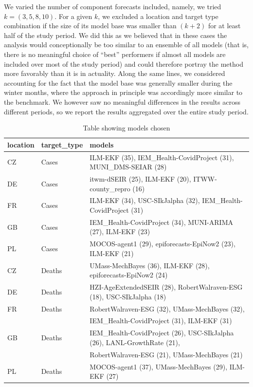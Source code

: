 We varied the number of component forecasts included, namely, we tried $k = (3,5,8,10)$. For a given $k$, we excluded a location and target type combination if the size of its model base was smaller than $(k+2)$ for at least half of the study period. We did this as we believed that in these cases the analysis would conceptionally be too similar to an ensemble of all models (that is, there is no meaningful choice of ``best'' performers if almost all models are included over most of the study period) and could therefore portray the method more favorably than it is in actuality. Along the same lines, we considered accounting for the fact that the model base was generally smaller during the winter months, where the approach in principle was accordingly more similar to the benchmark. We however saw no meaningful differences in the results across different periods, so we report the results aggregated over the entire study period.\\
\begin{table}[t]
\centering
\begin{tabular}{lll}
\hline
location & target\_type & models\\
\hline
CZ & Cases & ILM-EKF (35), IEM\_Health-CovidProject (31), MUNI\_DMS-SEIAR (28)\\[0.1em]
DE & Cases & itwm-dSEIR (25), ILM-EKF (20), ITWW-county\_repro (16)\\[0.1em]
FR & Cases & ILM-EKF (34), USC-SIkJalpha (32), IEM\_Health-CovidProject (31)\\[0.1em]
GB & Cases & IEM\_Health-CovidProject (34), MUNI-ARIMA (27), ILM-EKF (23)\\[0.1em]
PL & Cases & MOCOS-agent1 (29), epiforecasts-EpiNow2 (23), ILM-EKF (21)\\[0.8em]
CZ & Deaths & UMass-MechBayes (36), ILM-EKF (28), epiforecasts-EpiNow2 (24)\\[0.1em]
DE & Deaths & HZI-AgeExtendedSEIR (28), RobertWalraven-ESG (18), USC-SIkJalpha (18)\\[0.1em]
FR & Deaths & RobertWalraven-ESG (32), UMass-MechBayes (32),\\
& & IEM\_Health-CovidProject (31), ILM-EKF (31)\\[0.1em]
GB & Deaths & IEM\_Health-CovidProject (26), USC-SIkJalpha (26), LANL-GrowthRate (21), \\
& & RobertWalraven-ESG (21), UMass-MechBayes (21)\\[0.1em]
PL & Deaths & MOCOS-agent1 (37), UMass-MechBayes (29), ILM-EKF (27)\\
\hline
\end{tabular}
\caption{Table showing models chosen}
\label{tab:bp_chosenmods}
\end{table}
